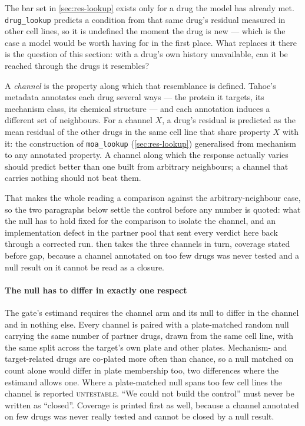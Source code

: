 \noindent

\noindent
The bar set in \cref{sec:res-lookup} exists only for a drug the model has already
met. \texttt{drug\_lookup} predicts a condition from that same drug's residual
measured in other cell lines, so it is undefined the moment the drug is new ---
which is the case a model would be worth having for in the first place. What
replaces it there is the question of this section: with a drug's own history
unavailable, can it be reached through the drugs it resembles?

A \emph{channel} is the property along which that resemblance is defined. Tahoe's
metadata annotates each drug several ways --- the protein it targets, its
mechanism class, its chemical structure --- and each annotation induces a
different set of neighbours. For a channel $X$, a drug's residual is predicted as
the mean residual of the other drugs in the same cell line that share property $X$
with it: the construction of \texttt{moa\_lookup} (\cref{sec:res-lookup})
generalised from mechanism to any annotated property. A channel along which the
response actually varies should predict better than one built from arbitrary
neighbours; a channel that carries nothing should not beat them.

That makes the whole reading a comparison against the arbitrary-neighbour case, so
the two paragraphs below settle the control before any number is quoted: what the
null has to hold fixed for the comparison to isolate the channel, and an
implementation defect in the partner pool that sent every verdict here back
through a corrected run.  then takes the three channels in
turn, coverage stated before gap, because a channel annotated on too few drugs was
never tested and a null result on it cannot be read as a closure.

\paragraph{The null has to differ in exactly one respect} The gate's estimand
requires the channel arm and its null to differ in the channel and in nothing
else. Every channel is paired with a plate-matched random null carrying the same
number of partner drugs, drawn from the same cell line, with the same split
across the target's own plate and other plates. Mechanism- and target-related
drugs are co-plated more often than chance, so a null matched on count alone
would differ in plate membership too, two differences where the estimand allows
one. Where a plate-matched null spans too few cell lines the channel is reported
\textsc{untestable}. ``We could not build the control'' must never be written as
``closed''. Coverage is printed first as well, because a channel annotated on few
drugs was never really tested and cannot be closed by a null result.

